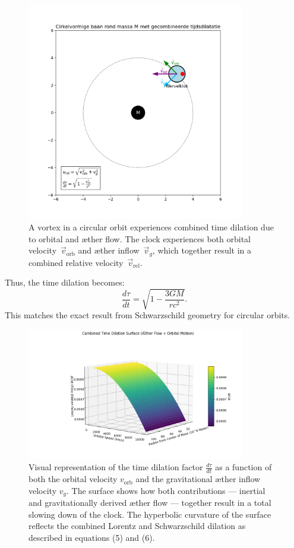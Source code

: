 \begin{figure}[htbp]
    \centering
    \includegraphics[width=0.85\textwidth]{../08-BaanRondMassa}
    \caption{A vortex in a circular orbit experiences combined time dilation due to orbital and æther flow. The clock experiences both orbital velocity~$\vec{v}_{\mathrm{orb}}$ and æther inflow~$\vec{v}_g$, which together result in a combined relative velocity~$\vec{v}_{\mathrm{rel}}$.}
    \label{fig:BaanRondMassa}
\end{figure}

Thus, the time dilation becomes:
\[
\frac{d\tau}{dt} = \sqrt{1 - \frac{3GM}{rc^2}}. \tag{6}
\]
This matches the exact result from Schwarzschild geometry for circular orbits.

\begin{figure}[htbp]
    \centering
    \includegraphics[width=0.85\textwidth]{../09-en-TimeDialationCombined}
    \caption{Visual representation of the time dilation factor \( \frac{d\tau}{dt} \) as a function of both the orbital velocity \( v_{\text{orb}} \) and the gravitational æther inflow velocity \( v_g \). The surface shows how both contributions — inertial and gravitationally derived æther flow — together result in a total slowing down of the clock. The hyperbolic curvature of the surface reflects the combined Lorentz and Schwarzschild dilation as described in equations (5) and (6).}
    \label{fig:TimeDialationCombined}
\end{figure}

